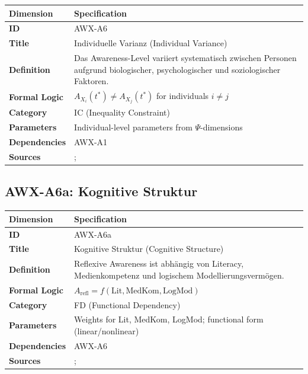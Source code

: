 \begin{table}[htbp]
\small
\begin{tabular}{p{3cm}p{11cm}}
\toprule
\textbf{Dimension} & \textbf{Specification} \\
\midrule
\textbf{ID} & AWX-A6 \\
\textbf{Title} & Individuelle Varianz (Individual Variance) \\
\textbf{Definition} & Das Awareness-Level variiert systematisch zwischen Personen aufgrund biologischer, psychologischer und soziologischer Faktoren. \\
\textbf{Formal Logic} & $A_{X_i}(t^*) \neq A_{X_j}(t^*)$ for individuals $i \neq j$ \\
\textbf{Category} & IC (Inequality Constraint) \\
\textbf{Parameters} & Individual-level parameters from $\Psi$-dimensions \\
\textbf{Dependencies} & AWX-A1 \\
\textbf{Sources} & \citet{heckman2006effects}; \citet{cunha2007technology} \\
\bottomrule
\end{tabular}
\end{table}


\subsection{AWX-A6a: Kognitive Struktur}

\begin{table}[htbp]
\small
\begin{tabular}{p{3cm}p{11cm}}
\toprule
\textbf{Dimension} & \textbf{Specification} \\
\midrule
\textbf{ID} & AWX-A6a \\
\textbf{Title} & Kognitive Struktur (Cognitive Structure) \\
\textbf{Definition} & Reflexive Awareness ist abhängig von Literacy, Medienkompetenz und logischem Modellierungsvermögen. \\
\textbf{Formal Logic} & $A_{\text{refl}} = f(\text{Lit}, \text{MedKom}, \text{LogMod})$ \\
\textbf{Category} & FD (Functional Dependency) \\
\textbf{Parameters} & Weights for Lit, MedKom, LogMod; functional form (linear/nonlinear) \\
\textbf{Dependencies} & AWX-A6 \\
\textbf{Sources} & \citet{lusardi2014economic}; \citet{hanushek2012knowledge} \\
\bottomrule
\end{tabular}
\end{table}

